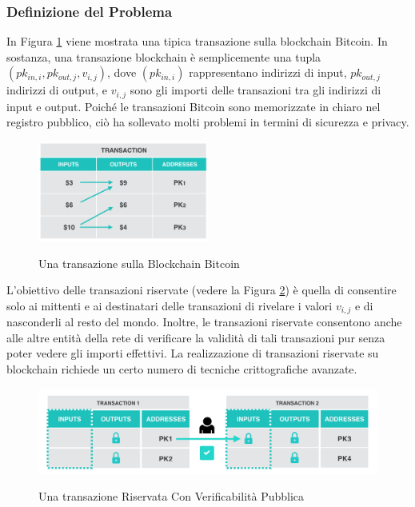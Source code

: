 \subsubsection{Definizione del Problema}
In Figura \ref{fig:fig4} viene mostrata una tipica transazione sulla blockchain Bitcoin. In sostanza, una transazione blockchain è semplicemente una tupla $({pk_{in,i}, {pk_{out,j},{v_{i,j}}}})$, dove $({pk_{in,i}})$ rappresentano indirizzi di input, ${pk_{out,j}}$ indirizzi di output, e ${v_{i,j}}$ sono gli importi delle transazioni tra gli indirizzi di input e output. Poiché le transazioni Bitcoin sono memorizzate in chiaro nel registro pubblico, ciò ha sollevato molti problemi in termini di sicurezza e privacy.

\begin{figure}[ht]
	\centering
	\includegraphics[width=0.5\textwidth]{Figura4.png}
	\label{fig:fig4}
	\caption{Una transazione sulla Blockchain Bitcoin}
\end{figure}

L'obiettivo delle transazioni riservate (vedere la Figura \ref{fig:fig5}) è quella di consentire solo ai mittenti e ai destinatari delle transazioni di rivelare i valori ${v_{i,j}}$ e di nasconderli al resto
del mondo. Inoltre, le transazioni riservate consentono anche alle altre entità della rete di verificare la validità di tali transazioni pur senza poter vedere gli importi effettivi. La realizzazione di transazioni riservate su blockchain richiede un certo numero di tecniche crittografiche avanzate.

\begin{figure}[ht]
	\includegraphics[width=\textwidth]{Figura5.png}
	\label{fig:fig5}
	\caption{Una transazione Riservata Con Verificabilità Pubblica}
\end{figure}


